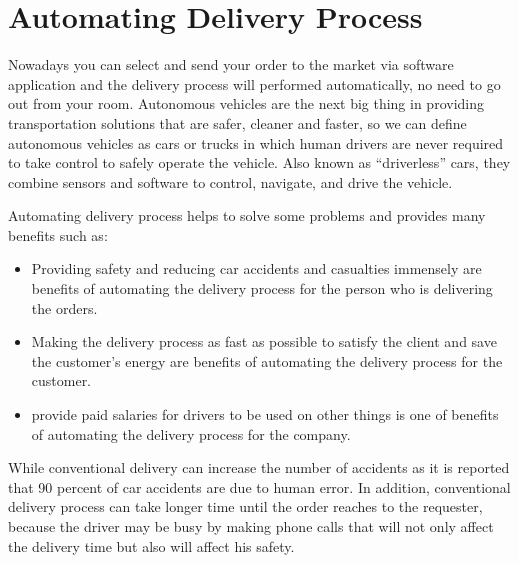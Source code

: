 \section {Automating Delivery Process}
\hspace{2cm} Nowadays you can select and send your order to the market via software application and the delivery process will performed automatically, no need to go out from your room.
Autonomous vehicles are the next big thing in providing transportation solutions that are safer, cleaner and faster, so we can define autonomous vehicles as cars or trucks in which human drivers are never required to take control to safely operate the vehicle. Also known as “driverless” cars, they combine sensors and software to control, navigate, and drive the vehicle.\cite{web016}
\par
Automating delivery process helps to solve some problems and provides many benefits such as:
\begin{itemize}
    \item Providing safety and reducing car accidents and casualties immensely are benefits of automating the delivery process for the person who is delivering the orders.
    \item Making the delivery process as fast as possible to satisfy the client and save the customer's energy are benefits of automating the delivery process for the customer.
    \item provide paid salaries for drivers to be used on other things is one of benefits of automating the delivery process for the company.
    
\end{itemize}
While conventional delivery can increase the number of accidents as it is reported that 90 percent of car accidents are due to human error. In addition, conventional delivery process can take longer time until the order reaches to the requester, because the driver may be busy by making phone calls that will not only affect the delivery time but also will affect his safety.

